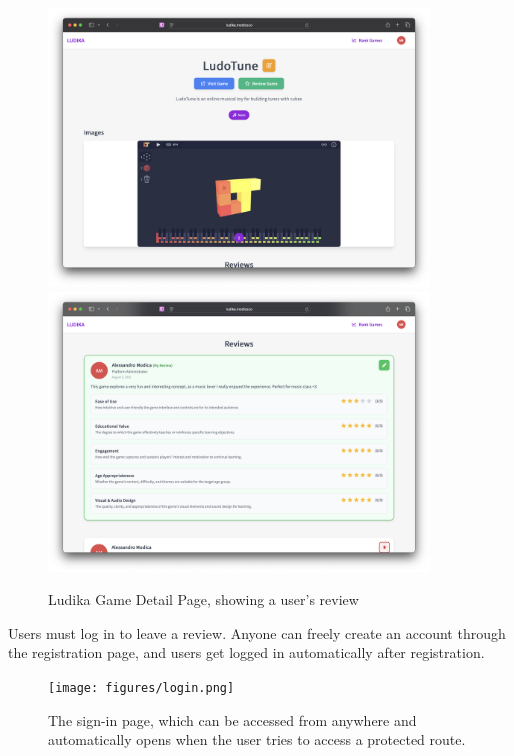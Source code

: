 \documentclass[11pt,italian,a4paper]{article}
\begin{document}
\begin{figure}[H]
    \centering
    \includegraphics[width=0.9\textwidth,trim={0 1cm 0 1cm}]{figures/game_detail_view.png}
    \includegraphics[width=0.9\textwidth,trim={0 2cm 0 1cm}]{figures/game_detail_review.png}
    \caption{Ludika Game Detail Page, showing a user's review}
\end{figure}

Users must log in to leave a review. Anyone can freely create an account through the registration page, and users get logged in automatically after registration.

\begin{figure}[H]
    \centering
    \texttt{[image: figures/login.png]}
    \caption{The sign-in page, which can be accessed from anywhere and automatically opens when the user tries to access a protected route.}
\end{figure}
\end{document}
